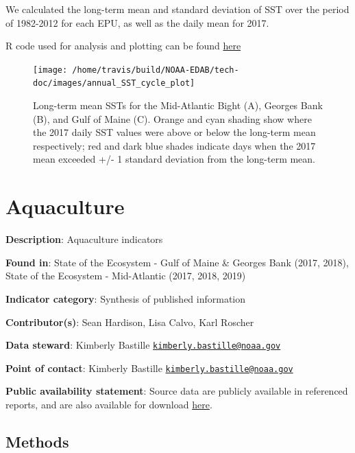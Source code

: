 \documentclass[
]{book}
\begin{document}
We calculated the long-term mean and standard deviation of SST over the period of 1982-2012 for each EPU, as well as the daily mean for 2017.

R code used for analysis and plotting can be found \href{https://github.com/NOAA-EDAB/tech-doc/blob/master/R/stored_scripts/annual_sst_cycles_analysis_and_plotting.R}{here}

\begin{figure}

{\centering \texttt{[image: /home/travis/build/NOAA-EDAB/tech-doc/images/annual\_SST\_cycle\_plot]} 

}

\caption{Long-term mean SSTs for the Mid-Atlantic Bight (A), Georges Bank (B), and Gulf of Maine (C). Orange and cyan shading show where the 2017 daily SST values were above or below the long-term mean respectively; red and dark blue shades indicate days when the 2017 mean exceeded +/- 1 standard deviation from the long-term mean.}\label{fig:unnamed-chunk-1}
\end{figure}

\hypertarget{aquaculture}{%
\chapter{Aquaculture}\label{aquaculture}}

\textbf{Description}: Aquaculture indicators

\textbf{Found in}: State of the Ecosystem - Gulf of Maine \& Georges Bank (2017, 2018), State of the Ecosystem - Mid-Atlantic (2017, 2018, 2019)

\textbf{Indicator category}: Synthesis of published information

\textbf{Contributor(s)}: Sean Hardison, Lisa Calvo, Karl Roscher

\textbf{Data steward}: Kimberly Bastille \href{mailto:kimberly.bastille@noaa.gov}{\nolinkurl{kimberly.bastille@noaa.gov}}

\textbf{Point of contact}: Kimberly Bastille \href{mailto:kimberly.bastille@noaa.gov}{\nolinkurl{kimberly.bastille@noaa.gov}}

\textbf{Public availability statement}: Source data are publicly available in referenced reports, and are also available for download \href{https://comet.nefsc.noaa.gov/erddap/tabledap/aquaculture_soe_v1.html}{here}.

\hypertarget{methods-2}{%
\section{Methods}\label{methods-2}}
\end{document}
